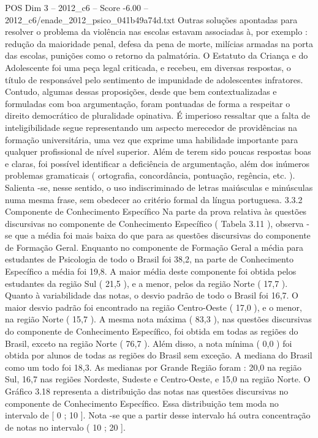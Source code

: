 \begin{textsample}{POS Dim 3 – 2012\_c6 – Score -6.00 – 2012\_c6/enade\_2012\_psico\_041b49a74d.txt}
Outras soluções apontadas para resolver o problema da violência nas escolas estavam associadas à, por exemplo : redução da maioridade penal, defesa da pena de morte, milícias armadas na porta das escolas, punições como o retorno da palmatória.
O Estatuto da Criança e do Adolescente foi uma peça legal criticada, e recebeu, em diversas respostas, o título de responsável pelo sentimento de impunidade de adolescentes infratores.
Contudo, algumas dessas proposições, desde que bem contextualizadas e formuladas com boa argumentação, foram pontuadas de forma a respeitar o direito democrático de pluralidade opinativa.
É imperioso ressaltar que a falta de inteligibilidade segue representando um aspecto merecedor de providências na formação universitária, uma vez que exprime uma habilidade importante para qualquer profissional de nível superior.
Além de terem sido poucas respostas boas e claras, foi possível identificar a deficiência de argumentação, além dos inúmeros problemas gramaticais ( ortografia, concordância, pontuação, regência, etc. ).
Salienta -se, nesse sentido, o uso indiscriminado de letras maiúsculas e minúsculas numa mesma frase, sem obedecer ao critério formal da língua portuguesa. 3.3.2 Componente de Conhecimento Específico Na parte da prova relativa às questões discursivas no componente de Conhecimento Específico ( Tabela 3.11 ), observa -se que a média foi mais baixa do que para as questões discursivas do componente de Formação Geral.
Enquanto no componente de Formação Geral a média para estudantes de Psicologia de todo o Brasil foi 38,2, na parte de Conhecimento Específico a média foi 19,8.
A maior média deste componente foi obtida pelos estudantes da região Sul ( 21,5 ), e a menor, pelos da região Norte ( 17,7 ).
Quanto à variabilidade das notas, o desvio padrão de todo o Brasil foi 16,7.
O maior desvio padrão foi encontrado na região Centro-Oeste ( 17,0 ), e o menor, na região Norte ( 15,7 ).
A mesma nota máxima ( 83,3 ), nas questões discursivas do componente de Conhecimento Específico, foi obtida em todas as regiões do Brasil, exceto na região Norte ( 76,7 ).
Além disso, a nota mínima ( 0,0 ) foi obtida por alunos de todas as regiões do Brasil sem exceção.
A mediana do Brasil como um todo foi 18,3.
As medianas por Grande Região foram : 20,0 na região Sul, 16,7 nas regiões Nordeste, Sudeste e Centro-Oeste, e 15,0 na região Norte.
O Gráfico 3.18 representa a distribuição das notas nas questões discursivas no componente de Conhecimento Específico.
Essa distribuição tem moda no intervalo de [ 0 ; 10 ].
Nota -se que a partir desse intervalo há outra concentração de notas no intervalo ( 10 ; 20 ].

\end{textsample}
